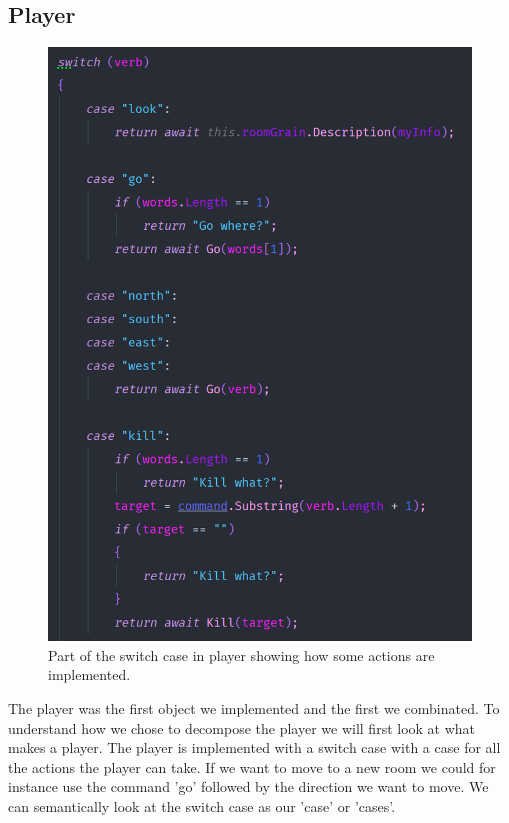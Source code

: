 \subsection{Player} \label{BuildPlayer}
\begin{figure}
	\vspace{-10px}
	\includegraphics[width=\linewidth]{Materials/Decomposition/switchcases}
	\caption{Part of the switch case in player showing how some actions are implemented.}
\end{figure}
The player was the first object we implemented and the first we combinated. To understand how we chose to decompose the player we will first look at what makes a player. The player is implemented with a switch case with a case for all the actions the player can take. If we want to move to a new room we could for instance use the command 'go' followed by the direction we want to move. We can semantically look at the switch case as our 'case' or 'cases'.\\
